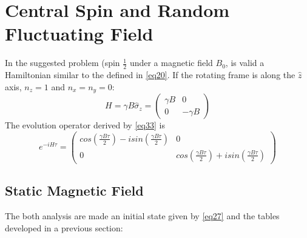 \documentclass{article}
\begin{document}
\section{Central Spin and Random Fluctuating Field}
In the suggested problem (spin $\frac{1}{2}$ under a magnetic field $B_0$, is valid a Hamiltonian similar to the defined in \ref{eq20}. If the rotating frame is along the $\hat{z}$ axis, $n_z=1$ and $n_x=n_y=0$:
\begin{equation}\label{eq33}H=\gamma B\hat\sigma_z=\begin{pmatrix} \gamma B & 0\\ 0& -\gamma B  \end{pmatrix}\end{equation}
The evolution operator derived by \ref{eq33} is
\begin{equation}\label{eq34}e^{-iH\tau}=\begin{pmatrix} cos(\frac{\gamma B\tau}{2})-isin(\frac{\gamma B \tau}{2})& 0\\ 0 & cos(\frac{\gamma B \tau}{2})+i sin(\frac{\gamma B \tau}{2}) \end{pmatrix}\end{equation}
\subsection{Static Magnetic Field} The both analysis are made an initial state given by \ref{eq27} and the tables developed in a previous section:
\end{document}
